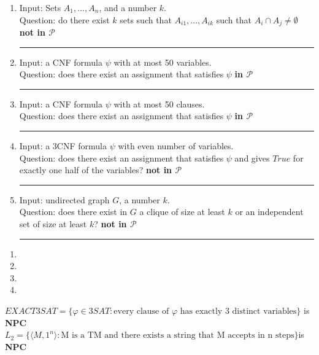 \documentclass[10pt,landscape]{article}
\theoremstyle{plain}%
\theoremstyle{definition}
\theoremstyle{remark}
\begin{document}
\begin{multicols}{3}
\begin{enumerate}[label=(\alph*)]
\item Input:  Sets $A_1, ..., A_n$, and a number $k$.\\ Question: do there exist $k$  sets such that $A_{i1} 
, ..., A_{ik}$ such that $A_i\cap A_j\neq \emptyset $
\textbf{ not in  $\mathcal{P}$}\hrule
\item  
Input: a CNF formula $\psi$ with at most 50 variables.
\\Question: does there exist an assignment that satisfies  $\psi$ 
\textbf{ in  $\mathcal{P}$}\hrule
\item Input: a CNF formula $\psi$ with at most 50 clauses.
\\Question: does there exist an assignment that satisfies  $\psi$ 
\textbf{ in  $\mathcal{P}$}\hrule
\item 
Input: a 3CNF formula $\psi$ with even number of variables.
\\Question: does there exist an assignment that satisfies  $\psi$   and gives  $True$ 
for exactly one half of the variables?
 \textbf{ not in  $\mathcal{P}$}\hrule
\item 
Input: undirected graph $G$, a number $k$.
\\Question: does there exist in $G$ a clique of size at least $k$ or an independent set of size at least $k$?\textbf{ not in  $\mathcal{P}$}\hrule

\end{enumerate}
\begin{enumerate}[label=(\alph*)]
\item {} 
\item {}
\item {}
\item {}
\end{enumerate}
$ EXACT3SAT=\{\varphi \in 3SAT:\text{every clause of $\varphi$ has exactly 3 distinct variables}\}$ is \textbf{NPC}\\
$ L_2=\{\langle M,1^n \rangle :\text{M is a TM and there exists a string that M accepts in n steps}\}
$is \textbf{NPC}\\

\end{multicols}
\end{document}
